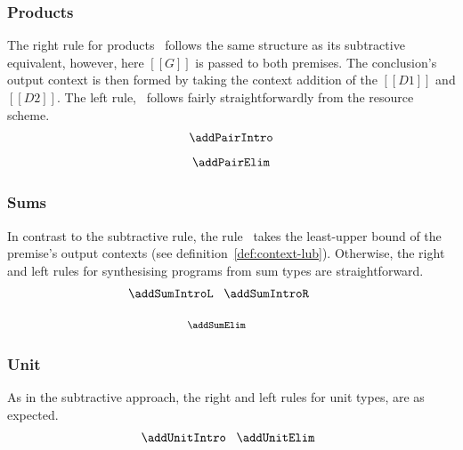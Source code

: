 \subsubsection{Products}
The right rule for products \addPairIntroName\ follows the same structure as its
subtractive equivalent, however, here $[[ G ]]$ is passed to both premises.
The conclusion's output context is then formed by taking the context addition of
the $[[ D1 ]]$ and $[[ D2 ]]$. The left rule, \addPairElimName\ follows fairly
straightforwardly from the resource scheme.
\begin{align*}
\begin{array}{c}
  \addPairIntro
\\[0.8em]
  \addPairElim
\end{array}
  \end{align*}

\subsubsection{Sums}
In contrast to the subtractive rule, the rule \addSumElimName\ takes the least-upper bound of
the premise's output contexts (see definition~\ref{def:context-lub}). Otherwise,
the right and left rules for synthesising programs from sum types are straightforward.
\begin{align*}
\begin{array}{c}
  \hspace{-2em}\addSumIntroL
  \;\;\;
  \addSumIntroR
\\[1.25em]
\hspace{-2em}{\footnotesize{\!\!\addSumElim}}
\end{array}
  \end{align*}

\subsubsection{Unit}
As in the subtractive approach, the right and left rules for unit types, are
as expected.
\begin{align*}
\begin{array}{c}
  \hspace{-0.5em}\addUnitIntro
  \;\;\;
  \addUnitElim
\end{array}
  \end{align*}


